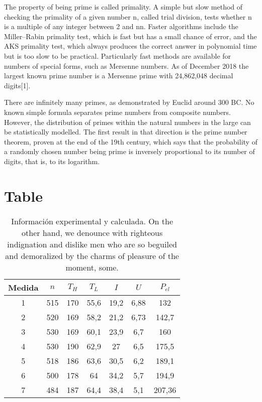 The property of being prime is called primality. A simple but slow method of
checking the primality of a given number n, called trial
division, tests whether n is a multiple of any integer between
2 and { { {n}}}{ {n}}. Faster algorithms include the
Miller–Rabin primality test, which is fast but has a small chance of error, and
the AKS primality test, which always produces the correct answer in polynomial
time but is too slow to be practical. Particularly fast methods are available
for numbers of special forms, such as Mersenne numbers. As of December 2018 the
largest known prime number is a Mersenne prime with 24,862,048 decimal
digits[1].

There are infinitely many primes, as demonstrated by Euclid around 300 BC. No
known simple formula separates prime numbers from composite numbers. However,
the distribution of primes within the natural numbers in the large can be
statistically modelled. The first result in that direction is the prime number
theorem, proven at the end of the 19th century, which says that the probability
of a randomly chosen number being prime is inversely proportional to its number
of digits, that is, to its logarithm.


\section{Table}

\begin{table}[ht]
  \centering
  \renewcommand{\arraystretch}{1.25}
  \setlength{\tabcolsep}{1.5\tabcolsep}
  \caption{Información experimental y calculada. On the other hand, we denounce
    with righteous indignation and dislike men who are so beguiled and
    demoralized by the charms of pleasure of the moment, some.}
  \label{tab:info}
  \begin{tabular}{*7c} \toprule
    Medida & $n$ & $T_H$ & $T_L$ & $I$ & $U$ & $P_{el}$ \\
    \midrule
    1  & 515 & 170 & 55,6 & 19,2  & 6,88 & 132    \\
    2  & 520 & 169 & 58,2 & 21,2  & 6,73 & 142,7  \\
    3  & 530 & 169 & 60,1 & 23,9  & 6,7  & 160    \\
    4  & 530 & 190 & 62,9 & 27    & 6,5  & 175,5  \\
    5  & 518 & 186 & 63,6 & 30,5  & 6,2  & 189,1  \\
    6  & 500 & 178 & 64   & 34,2  & 5,7  & 194,9  \\
    7  & 484 & 187 & 64,4 & 38,4  & 5,1  & 207,36 \\
    \bottomrule
  \end{tabular}
\end{table}


